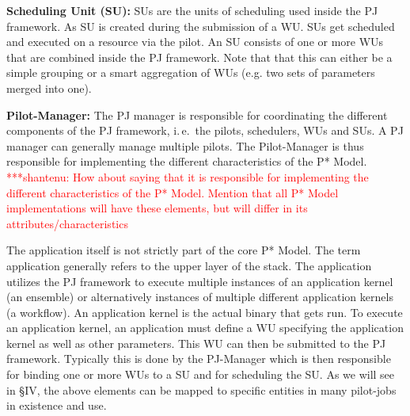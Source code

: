 \documentclass[conference,final]{IEEEtran}
\newcommand{\jhanote}[1]{ {\textcolor{red} { ***shantenu: #1 }}}
\newcommand{\alnote}[1]{ {\textcolor{blue} { ***andre: #1 }}}
\newcommand{\alnote}[1]{}
\newcommand{\jhanote}[1]{}
\begin{document}
\begin{compactitem}
\item \textbf{Scheduling Unit (SU):} 
SUs are the units of scheduling used inside the PJ framework. As SU is created during the submission of a WU. SUs
get scheduled and executed on a resource via the pilot. An SU consists of one or more WUs that are combined inside
the PJ framework. Note that that this can either be a simple grouping or a smart aggregation of WUs (e.g. two sets
of parameters merged into one).



  


\item \textbf{Pilot-Manager:} The PJ manager is responsible for
  coordinating the different components of the PJ framework, i.\,e.\ the
  pilots, schedulers, WUs and SUs. A PJ manager can generally manage multiple
  pilots.   The Pilot-Manager is thus responsible for
  implementing the different characteristics of the P*
  Model.  
 \jhanote{How about saying that it is responsible for
    implementing the different characteristics of the P*
    Model. Mention that all P* Model implementations will have these
    elements, but will differ in its attributes/characteristics}
\end{compactitem}

The application itself is not strictly part of the core P* Model. The
term application generally refers to the upper layer of the stack. The
application utilizes the PJ framework to execute multiple instances of
an application kernel (an ensemble) or alternatively instances of
multiple different application kernels (a workflow). An application
kernel is the actual binary that gets run.  To execute an application
kernel, an application must define a WU specifying the application
kernel as well as other parameters. This WU can then be submitted to
the PJ framework. Typically this is done by the PJ-Manager which is
then responsible for binding one or more WUs to a SU and for
scheduling the SU.	
As we will see in \S{IV}, the above elements can be mapped to specific
entities in many pilot-jobs in existence and use.
\end{document}
